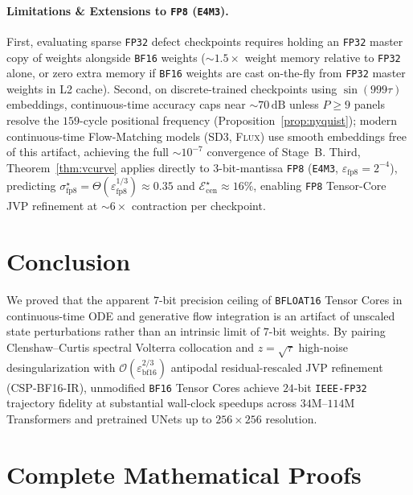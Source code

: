 \documentclass[11pt,a4paper]{article}
\theoremstyle{definition}
\theoremstyle{remark}
\newcommand{\bfsixteen}{\texttt{BF16}}
\newcommand{\fpthirtytwo}{\texttt{FP32}}
\newcommand{\epsbf}{\varepsilon_{\mathrm{bf16}}}
\begin{document}
\paragraph{Limitations \& Extensions to \texttt{FP8} (\texttt{E4M3}).}
First, evaluating sparse \fpthirtytwo{} defect checkpoints requires holding an \fpthirtytwo{} master copy of weights alongside \bfsixteen{} weights ($\sim 1.5\times$ weight memory relative to \fpthirtytwo{} alone, or zero extra memory if \bfsixteen{} weights are cast on-the-fly from \fpthirtytwo{} master weights in L2 cache). Second, on discrete-trained checkpoints using $\sin(999\tau)$ embeddings, continuous-time accuracy caps near $\sim 70\,\mathrm{dB}$ unless $P \ge 9$ panels resolve the $159$-cycle positional frequency (Proposition~\ref{prop:nyquist}); modern continuous-time Flow-Matching models (\textsc{SD3}, \textsc{Flux}) use smooth embeddings free of this artifact, achieving the full $\sim 10^{-7}$ convergence of Stage~B. Third, Theorem~\ref{thm:vcurve} applies directly to $3$-bit-mantissa \texttt{FP8} (\texttt{E4M3}, $\varepsilon_{\mathrm{fp8}} = 2^{-4}$), predicting $\sigma_{\mathrm{fp8}}^\star = \Theta(\varepsilon_{\mathrm{fp8}}^{1/3}) \approx 0.35$ and $\mathcal{E}_{\mathrm{cen}}^\star \approx 16\%$, enabling \texttt{FP8} Tensor-Core JVP refinement at $\sim 6\times$ contraction per checkpoint.

\section{Conclusion}
We proved that the apparent $7$-bit precision ceiling of \texttt{BFLOAT16} Tensor Cores in continuous-time ODE and generative flow integration is an artifact of unscaled state perturbations rather than an intrinsic limit of $7$-bit weights. By pairing Clenshaw--Curtis spectral Volterra collocation and $z=\sqrt{\tau}$ high-noise desingularization with $\mathcal{O}(\epsbf^{2/3})$ antipodal residual-rescaled JVP refinement (\textsc{CSP-BF16-IR}), unmodified \bfsixteen{} Tensor Cores achieve $24$-bit \texttt{IEEE-FP32} trajectory fidelity at substantial wall-clock speedups across $34\text{M}$--$114\text{M}$ Transformers and pretrained UNets up to $256 \times 256$ resolution.




\clearpage
\appendix

\section{Complete Mathematical Proofs}
\label{app:proofs}
\end{document}
